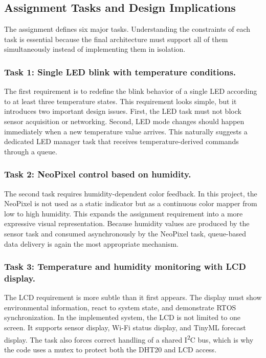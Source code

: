 \subsection{Assignment Tasks and Design Implications}
The assignment defines six major tasks. Understanding the constraints of each
task is essential because the final architecture must support all of them
simultaneously instead of implementing them in isolation.

\subsubsection*{Task 1: Single LED blink with temperature conditions.}
The first requirement is to redefine the blink behavior of a single LED
according to at least three temperature states. This requirement looks simple,
but it introduces two important design issues. First, the LED task must not
block sensor acquisition or networking. Second, LED mode changes should happen
immediately when a new temperature value arrives. This naturally suggests a
dedicated LED manager task that receives temperature-derived commands through a
queue.

\subsubsection*{Task 2: NeoPixel control based on humidity.}
The second task requires humidity-dependent color feedback. In this project,
the NeoPixel is not used as a static indicator but as a continuous color mapper
from low to high humidity. This expands the assignment requirement into a more
expressive visual representation. Because humidity values are produced by the
sensor task and consumed asynchronously by the NeoPixel task, queue-based data
delivery is again the most appropriate mechanism.

\subsubsection*{Task 3: Temperature and humidity monitoring with LCD display.}
The LCD requirement is more subtle than it first appears. The display must show
environmental information, react to system state, and demonstrate RTOS
synchronization. In the implemented system, the LCD is not limited to one
screen. It supports sensor display, Wi-Fi status display, and TinyML forecast
display. The task also forces correct handling of a shared I\textsuperscript{2}C
bus, which is why the code uses a mutex to protect both the DHT20 and LCD
access.

